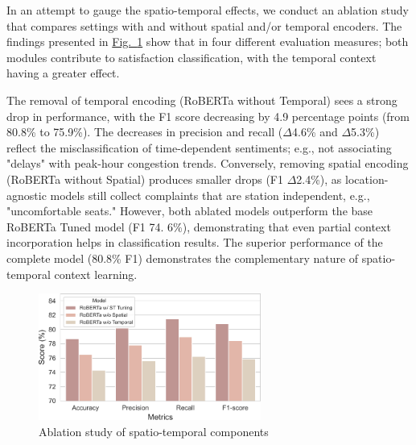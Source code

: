 \documentclass[a4paper,fleqn,12pt]{cas-sc}
\begin{document}
In an attempt to gauge the spatio-temporal effects, we conduct an ablation study that compares settings with and without spatial and/or temporal encoders. The findings presented in \hyperref[fig:ablation]{Fig.~\ref{fig:ablation}} show that in four different evaluation measures; both modules contribute to satisfaction classification, with the temporal context having a greater effect.

The removal of temporal encoding (RoBERTa without Temporal) sees a strong drop in performance, with the F1 score decreasing by 4.9 percentage points (from 80.8\% to 75.9\%). The decreases in precision and recall ($\Delta$4.6\% and $\Delta$5.3\%) reflect the misclassification of time-dependent sentiments; e.g., not associating "delays" with peak-hour congestion trends. Conversely, removing spatial encoding (RoBERTa without Spatial) produces smaller drops (F1 $\Delta$2.4\%), as location-agnostic models still collect complaints that are station independent, e.g., "uncomfortable seats." However, both ablated models outperform the base RoBERTa Tuned model (F1 74. 6\%), demonstrating that even partial context incorporation helps in classification results. The superior performance of the complete model (80.8\% F1) demonstrates the complementary nature of spatio-temporal context learning. 

\begin{figure}[htbp]
\centering
\includegraphics[width=0.65\textwidth]{figs/ablation.pdf}
\caption{Ablation study of spatio-temporal components}\label{fig:ablation}
\end{figure}


\end{document}
